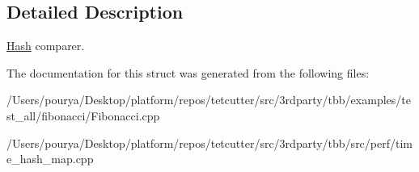 \subsection{Detailed Description}
\hyperlink{structHash}{Hash} comparer. 

The documentation for this struct was generated from the following files\+:\begin{DoxyCompactItemize}
\item 
/\+Users/pourya/\+Desktop/platform/repos/tetcutter/src/3rdparty/tbb/examples/test\+\_\+all/fibonacci/Fibonacci.\+cpp\item 
/\+Users/pourya/\+Desktop/platform/repos/tetcutter/src/3rdparty/tbb/src/perf/time\+\_\+hash\+\_\+map.\+cpp\end{DoxyCompactItemize}
